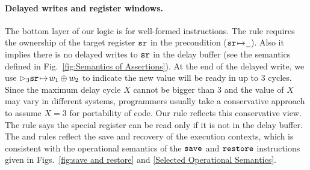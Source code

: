 \paragraph{\textbf{Delayed writes and register windows.}}
The bottom layer of our logic is for well-formed instructions.
The  rule requires the ownership
of the target
register $\texttt{sr}$ in the precondition (${\texttt{sr}} \!\mapsto\! {\underline{\ \,}}$).
Also it implies there is no delayed writes to $\texttt{sr}$
in the delay buffer (see the semantics defined in
Fig.~\ref{fig:Semantics of Assertions}).
At the end of the delayed write, we use
$\rhd_{3}{\texttt{sr}} \!\mapsto\! {w_1 \oplus w_2}$ to indicate
the new value will be ready in up to 3 cycles.
Since the maximum delay cycle $X$ cannot be bigger
than 3 and the value of $X$ may vary in different systems,
programmers usually take a conservative approach to
assume $X=3$ for portability of code. Our rule
reflects this conservative view.
The  rule says the special
register can be read only if it is not in the
delay buffer.
The  and  rules
reflect the save and recovery of the execution
contexts, which is consistent with the operational
semantics of the $\texttt{save}$ and $\texttt{restore}$ instructions
given in Figs.~\ref{fig:save and restore}
and \ref{Selected Operational Semantics}.



